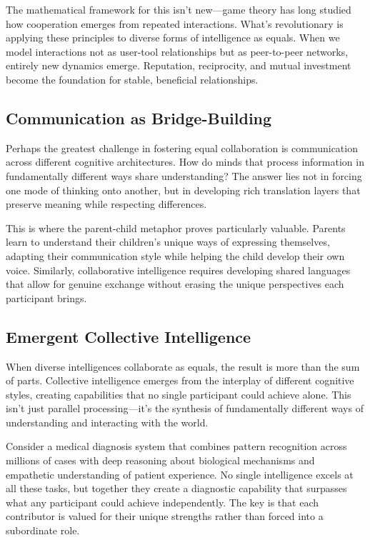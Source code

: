 The mathematical framework for this isn't new---game theory has long studied how cooperation emerges from repeated interactions.
What's revolutionary is applying these principles to diverse forms of intelligence as equals.
When we model interactions not as user-tool relationships but as peer-to-peer networks, entirely new dynamics emerge.
Reputation, reciprocity, and mutual investment become the foundation for stable, beneficial relationships.

\subsection{Communication as Bridge-Building}

Perhaps the greatest challenge in fostering equal collaboration is communication across different cognitive architectures.
How do minds that process information in fundamentally different ways share understanding?
The answer lies not in forcing one mode of thinking onto another, but in developing rich translation layers that preserve meaning while respecting differences.

This is where the parent-child metaphor proves particularly valuable.
Parents learn to understand their children's unique ways of expressing themselves, adapting their communication style while helping the child develop their own voice.
Similarly, collaborative intelligence requires developing shared languages that allow for genuine exchange without erasing the unique perspectives each participant brings.

\subsection{Emergent Collective Intelligence}

When diverse intelligences collaborate as equals, the result is more than the sum of parts.
Collective intelligence emerges from the interplay of different cognitive styles, creating capabilities that no single participant could achieve alone.
This isn't just parallel processing---it's the synthesis of fundamentally different ways of understanding and interacting with the world.

Consider a medical diagnosis system that combines pattern recognition across millions of cases with deep reasoning about biological mechanisms and empathetic understanding of patient experience.
No single intelligence excels at all these tasks, but together they create a diagnostic capability that surpasses what any participant could achieve independently.
The key is that each contributor is valued for their unique strengths rather than forced into a subordinate role.

